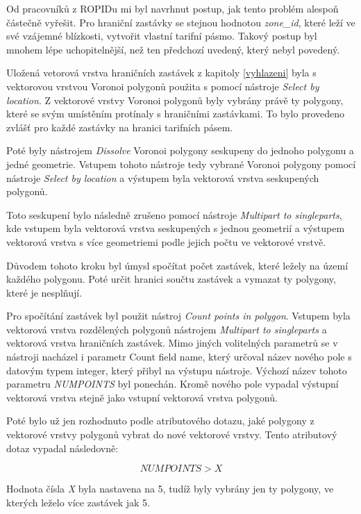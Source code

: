 Od pracovníků z ROPIDu mi byl navrhnut postup, jak tento problém alespoň částečně vyřešit. Pro hraniční zastávky se stejnou hodnotou \textit{zone\_id}, 
které leží ve své vzájemné blízkosti, vytvořit vlastní tarifní pásmo. Takový postup byl mnohem lépe uchopitelnější, než ten předchozí uvedený, který nebyl povedený.

Uložená vetorová vrstva hraničních zastávek z kapitoly \ref{vyhlazeni} byla s vektorovou vrstvou Voronoi polygonů
použita s pomocí nástroje \textit{Select by location}. Z vektorové vrstvy Voronoi polygonů byly vybrány právě ty polygony,
které se svým umístěním protínaly s hraničními zastávkami. To bylo provedeno zvlášť pro každé zastávky na hranici tarifních pásem.

Poté byly nástrojem \textit{Dissolve} Voronoi polygony seskupeny do jednoho polygonu a jedné geometrie. Vstupem tohoto nástroje
tedy vybrané Voronoi polygony pomocí nástroje \textit{Select by location} a výstupem byla vektorová vrstva seskupených polygonů.

Toto seskupení bylo následně zrušeno pomocí nástroje \textit{Multipart to singleparts}, kde vstupem byla vektorová vrstva 
seskupených s jednou geometrií a výstupem vektorová vrstva s více geometriemi podle jejich počtu ve vektorové vrstvě.

Důvodem tohoto kroku byl úmysl spočítat počet zastávek, které ležely na území každého polygonu. Poté určit hranici
součtu zastávek a vymazat ty polygony, které je nesplňují.

Pro spočítání zastávek byl použit nástroj \textit{Count points in polygon}. Vstupem byla vektorová vrstva rozdělených polygonů nástrojem \textit{Multipart to singleparts}
a vektorová vrstva hraničních zastávek. Mimo jiných volitelných parametrů se v nástroji nacházel i parametr Count field name, který určoval název nového pole
s datovým typem integer,
který přibyl na výstupu nástroje. Výchozí název tohoto parametru \textit{NUMPOINTS} byl ponechán. Kromě nového pole vypadal výstupní vektorová vrstva stejně
jako vstupní vektorová vrstva polygonů.

Poté bylo už jen rozhodnuto podle atributového dotazu, jaké polygony z vektorové vrstvy polygonů vybrat do nové vektorové vrstvy.
Tento atributový dotaz vypadal následovně: 

\[NUMPOINTS > X\]

Hodnota čísla \textit{X} byla nastavena na 5, tudíž byly vybrány jen ty polygony, ve kterých leželo více zastávek jak 5.

